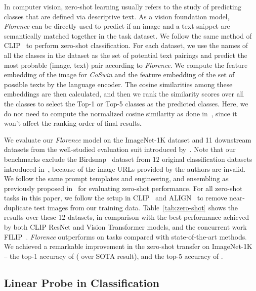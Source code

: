 \documentclass{article}
\begin{document}
In computer vision, zero-shot learning usually refers to the study of predicting classes that are
defined via descriptive text. As a vision foundation model, \emph{Florence} can be directly used to
predict if an image and a text snippet are semantically matched together in the task dataset. We
follow the same method of CLIP~\cite{radford2021learning} to perform zero-shot classification. For each
dataset, we use the names of all the classes in the dataset as the set of potential text pairings
and predict the most probable (image, text) pair according to \emph{Florence}. We compute the
feature embedding of the image for \emph{CoSwin} and the feature embedding of the set of possible
texts by the language encoder. The cosine similarities among these embeddings are then calculated,
and then we rank the similarity scores over all the classes to select the Top-1 or Top-5 classes as
the predicted classes. Here, we do not need to compute the normalized cosine similarity as done
in~\cite{radford2021learning}, since it won't affect the ranking order of final results.

We evaluate our \emph{Florence} model on the ImageNet-1K dataset and 11 downstream datasets from the
well-studied evaluation suit introduced by~\cite{kornblith2019better}. Note that our benchmarks
exclude the Birdsnap~\cite{6909656} dataset from 12 original classification datasets introduced
in~\cite{kornblith2019better}, because  of the image URLs provided by the authors
are invalid. We follow the same prompt templates and engineering, and ensembling
as previously proposed in~\cite{radford2021learning} for evaluating zero-shot performance. For all zero-shot tasks in this
paper, we follow the setup in CLIP~\cite{radford2021learning} and ALIGN~\cite{jia2021scaling} to
remove near-duplicate test images from our training data. Table~\ref{tab:zero-shot} shows the
results over these 12 datasets, in comparison with the best performance achieved by both CLIP ResNet
and Vision Transformer models, and the concurrent work FILIP~\cite{yao2021filip}. \emph{Florence} outperforms on  tasks compared with state-of-the-art methods. We achieved a remarkable improvement in the zero-shot transfer on ImageNet-1K -- the top-1 accuracy of  ( over SOTA result),  and the top-5 accuracy of
.

\subsection{Linear Probe in Classification}
\end{document}
